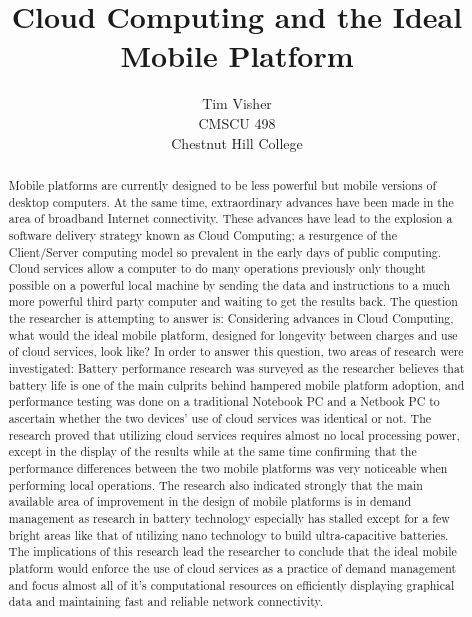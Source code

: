 \documentclass[12pt,oneside,letterpaper,titlepage]{report}
\author{Tim Visher\\ CMSCU 498\\ Chestnut Hill College}
\title{Cloud Computing and the Ideal Mobile Platform}
\begin{document}
\maketitle

\tableofcontents

\newpage

\begin{abstract}

Mobile platforms are currently designed to be less powerful but mobile versions
of desktop computers.  At the same time, extraordinary advances have been made
in the area of broadband Internet connectivity.  These advances have lead to the
explosion a software delivery strategy known as Cloud Computing; a resurgence of
the Client/Server computing model so prevalent in the early days of public
computing.  Cloud services allow a computer to do many operations previously
only thought possible on a powerful local machine by sending the data and
instructions to a much more powerful third party computer and waiting to get the
results back.  The question the researcher is attempting to answer is:
Considering advances in Cloud Computing, what would the ideal mobile platform,
designed for longevity between charges and use of cloud services, look like?  In
order to answer this question, two areas of research were investigated: Battery
performance research was surveyed as the researcher believes that battery life is
one of the main culprits behind hampered mobile platform adoption, and
performance testing was done on a traditional Notebook PC and a Netbook PC to
ascertain whether the two devices' use of cloud services was identical or not.
The research proved that utilizing cloud services requires almost no local
processing power, except in the display of the results while at the same time
confirming that the performance differences between the two mobile platforms was
very noticeable when performing local operations.  The research also indicated
strongly that the main available area of improvement in the design of mobile
platforms is in demand management as research in battery technology especially
has stalled except for a few bright areas like that of utilizing nano technology
to build ultra-capacitive batteries.  The implications of this research lead the
researcher to conclude that the ideal mobile platform would enforce the use of
cloud services as a practice of demand management and focus almost all of it's
computational resources on efficiently displaying graphical data and maintaining
fast and reliable network connectivity.

\end{abstract}
\end{document}
